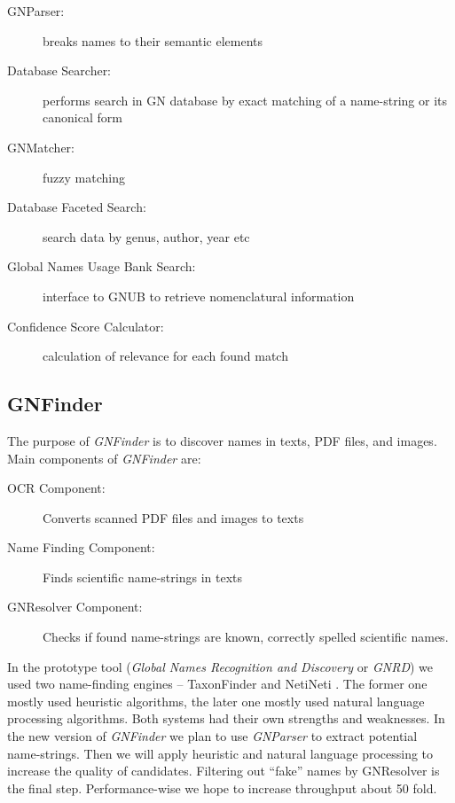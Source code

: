 \documentclass[11pt]{article}
\begin{document}
\begin{description}

  \item[GNParser:] breaks names to their semantic elements

  \item[Database Searcher:] performs search in GN database by exact matching of
    a name-string or its canonical form

  \item[GNMatcher:] fuzzy matching

  \item[Database Faceted Search:] search data by genus, author, year etc

  \item[Global Names Usage Bank Search:] interface to GNUB \cite{Pyle2016} to
    retrieve nomenclatural information

  \item[Confidence Score Calculator:] calculation of relevance for each found
    match \cite{Patterson:inpress-a}

\end{description}

\subsection{GNFinder}

The purpose of \textit{GNFinder} is to discover names in texts, PDF files, and
images. Main components of \textit{GNFinder} are:

\begin{description}
  \item[OCR Component:] Converts scanned PDF files and images to texts
  \item[Name Finding Component:] Finds scientific name-strings in texts
  \item[GNResolver Component:] Checks if found name-strings are known,
    correctly spelled scientific names.
\end{description}

In the prototype tool (\textit{Global Names Recognition and Discovery} or
\textit{GNRD}) \cite{gnrd} we used two name-finding engines -- TaxonFinder and
NetiNeti \cite{Akella2012}. The former one mostly used heuristic algorithms,
the later one mostly used natural language processing algorithms. Both systems
had their own strengths and weaknesses. In the new version of \textit{GNFinder}
we plan to use \textit{GNParser} \cite{gnparser} to extract potential
name-strings.  Then we will apply heuristic and natural language processing to
increase the quality of candidates. Filtering out ``fake'' names by GNResolver
is the final step. Performance-wise we hope to increase throughput about 50
fold.
\end{document}
